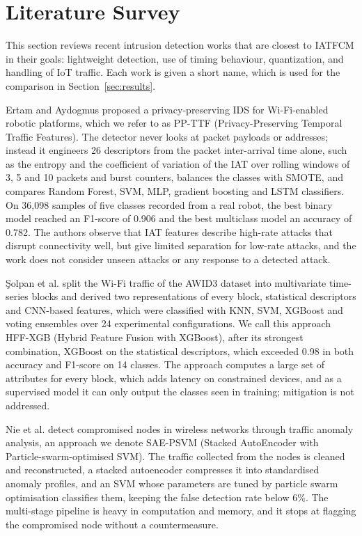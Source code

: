 \documentclass[]{interact}
\theoremstyle{plain}
\theoremstyle{definition}
\begin{document}
\section{Literature Survey}\label{sec:lit}
This section reviews recent intrusion detection works that are closest to IATFCM in their goals: lightweight detection, use of timing behaviour, quantization, and handling of IoT traffic. Each work is given a short name, which is used for the comparison in Section~\ref{sec:results}.

Ertam and Aydogmus\cite{ertam2026privacy} proposed a privacy-preserving IDS for Wi-Fi-enabled robotic platforms, which we refer to as PP-TTF (Privacy-Preserving Temporal Traffic Features). The detector never looks at packet payloads or addresses; instead it engineers 26 descriptors from the packet inter-arrival time alone, such as the entropy and the coefficient of variation of the IAT over rolling windows of 3, 5 and 10 packets and burst counters, balances the classes with SMOTE, and compares Random Forest, SVM, MLP, gradient boosting and LSTM classifiers. On 36,098 samples of five classes recorded from a real robot, the best binary model reached an F1-score of 0.906 and the best multiclass model an accuracy of 0.782. The authors observe that IAT features describe high-rate attacks that disrupt connectivity well, but give limited separation for low-rate attacks, and the work does not consider unseen attacks or any response to a detected attack.

\c{S}olpan et al.\cite{solpan2026hybrid} split the Wi-Fi traffic of the AWID3 dataset into multivariate time-series blocks and derived two representations of every block, statistical descriptors and CNN-based features, which were classified with KNN, SVM, XGBoost and voting ensembles over 24 experimental configurations. We call this approach HFF-XGB (Hybrid Feature Fusion with XGBoost), after its strongest combination, XGBoost on the statistical descriptors, which exceeded 0.98 in both accuracy and F1-score on 14 classes. The approach computes a large set of attributes for every block, which adds latency on constrained devices, and as a supervised model it can only output the classes seen in training; mitigation is not addressed.

Nie et al.\cite{nie2025intrusion} detect compromised nodes in wireless networks through traffic anomaly analysis, an approach we denote SAE-PSVM (Stacked AutoEncoder with Particle-swarm-optimised SVM). The traffic collected from the nodes is cleaned and reconstructed, a stacked autoencoder compresses it into standardised anomaly profiles, and an SVM whose parameters are tuned by particle swarm optimisation classifies them, keeping the false detection rate below 6\%. The multi-stage pipeline is heavy in computation and memory, and it stops at flagging the compromised node without a countermeasure.
\end{document}
